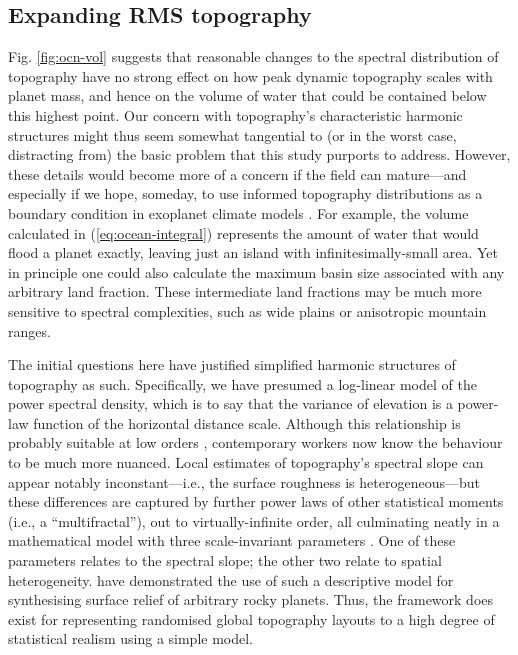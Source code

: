 \subsection{Expanding RMS topography} \label{sec:discussion-spectrum}

Fig. \ref{fig:ocn-vol} suggests that reasonable changes to the spectral distribution of topography have no strong effect on how peak dynamic topography scales with planet mass, and hence on the volume of water that could be contained below this highest point. Our concern with topography's characteristic harmonic structures might thus seem somewhat tangential to (or in the worst case, distracting from) the basic problem that this study purports to address. However, these details would become more of a concern if the field can mature---and especially if we hope, someday, to use informed topography distributions as a boundary condition in exoplanet climate models \citep[e.g.,][]{turbet_habitability_2016, rushby_effect_2019}. For example, the volume calculated in (\ref{eq:ocean-integral}) represents the amount of water that would flood a planet exactly, leaving just an island with infinitesimally-small area. Yet in principle one could also calculate the maximum basin size associated with any arbitrary land fraction. These intermediate land fractions may be much more sensitive to spectral complexities, such as wide plains or anisotropic mountain ranges.


The initial questions here have justified simplified harmonic structures of topography as such. Specifically, we have presumed a log-linear model of the power spectral density, which is to say that the variance of elevation is a power-law function of the horizontal distance scale. Although this relationship is probably suitable at low orders \citep{turcotte_fractal_1987}, contemporary workers now know the behaviour to be much more nuanced. Local estimates of topography's spectral slope can appear notably inconstant---i.e., the surface roughness is heterogeneous---but these differences are captured by further power laws of other statistical moments (i.e., a ``multifractal''), out to virtually-infinite order, all culminating neatly in a mathematical model with three scale-invariant parameters \citep[e.g.,][]{pelletier_selforganization_1999, gagnon_multifractal_2006, lovejoy_scaling_2007, alisaberi_percolation_2013, liucci_fractal_2017, rak_universal_2018, landais_multifractal_2019, keylock_holderconditioned_2020}. One of these parameters relates to the spectral slope; the other two relate to spatial heterogeneity. \citet{landais_topography_2019} have demonstrated the use of such a descriptive model for synthesising surface relief of arbitrary rocky planets. Thus, the framework does exist for representing randomised global topography layouts to a high degree of statistical realism using a simple model. 

